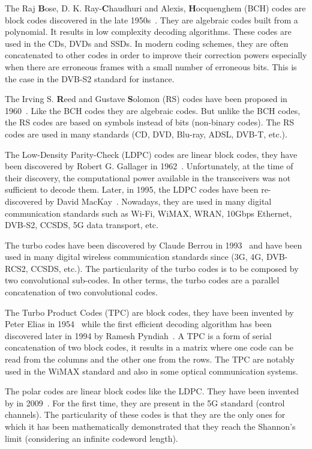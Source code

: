 The Raj \textbf{B}ose, D. K. Ray-\textbf{C}haudhuri and Alexis,
\textbf{H}ocquenghem (BCH) codes are block codes discovered in the late
1950s~\cite{Hocquenghem1959,Bose1960}. They are algebraic codes built from a
polynomial. It results in low complexity decoding algorithms. These codes are
used in the CDs, DVDs and SSDs. In modern coding schemes, they are often
concatenated to other codes in order to improve their correction powers
especially when there are erroneous frames with a small number of erroneous
bits. This is the case in the DVB-S2 standard for instance.

The Irving S. \textbf{R}eed and Gustave \textbf{S}olomon (RS) codes have been
proposed in 1960~\cite{Reed1960}. Like the BCH codes they are algebraic codes.
But unlike the BCH codes, the RS codes are based on symbols instead of bits
(non-binary codes). The RS codes are used in many standards (CD, DVD, Blu-ray,
ADSL, DVB-T, etc.). %

The Low-Density Parity-Check (LDPC) codes are linear block codes, they have been
discovered by Robert G. Gallager in 1962~\cite{Gallager1962}. Unfortunately, at
the time of their discovery, the computational power available in the
transceivers was not sufficient to decode them. Later, in 1995, the LDPC codes
have been re-discovered by David MacKay~\cite{MacKay1995}. Nowadays, they are
used in many digital communication standards such as Wi-Fi, WiMAX, WRAN, 10Gbps
Ethernet, DVB-S2, CCSDS, 5G data transport, etc.

The turbo codes have been discovered by Claude Berrou in 1993~\cite{Berrou1993}
and have been used in many digital wireless communication standards since (3G,
4G, DVB-RCS2, CCSDS, etc.). The particularity of the turbo codes is to be
composed by two convolutional sub-codes. In other terms, the turbo codes are a
parallel concatenation of two convolutional codes.

The Turbo Product Codes (TPC) are block codes, they have been invented by Peter
Elias in 1954~\cite{Elias1954} while the first efficient decoding algorithm has
been discovered later in 1994 by Ramesh Pyndiah~\cite{Pyndiah1994}. A TPC is a
form of serial concatenation of two block codes, it results in a matrix where
one code can be read from the columns and the other one from the rows. The TPC
are notably used in the WiMAX standard and also in some optical communication
systems.

The polar codes are linear block codes like the LDPC. They have been invented
by \Arikan in 2009~\cite{Arikan2009}. For the first time, they are present in
the 5G standard (control channels). The particularity of these codes is that
they are the only ones for which it has been mathematically demonstrated that
they reach the Shannon's limit (considering an infinite codeword length).

